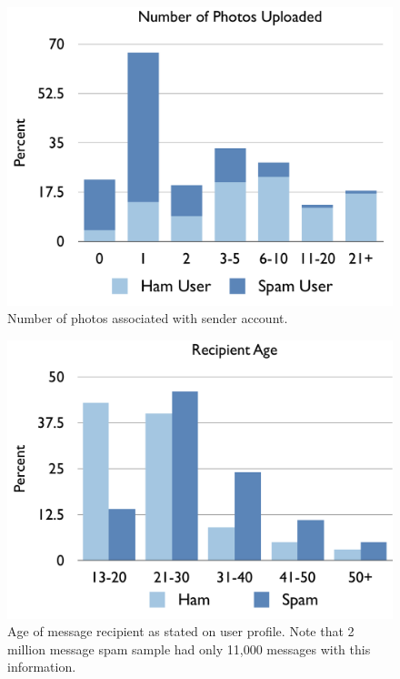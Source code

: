\documentclass[preprint]{acm_proc_article-sp}
\begin{document}
\begin{tabular}
{\begin{figure}[h]
    \centering
    \includegraphics[width=\linewidth]{figures/photos.pdf}
    \caption{Number of photos associated with sender account.}
    \label{fig:photos}
\end{figure}

\begin{figure}[h]
    \centering
    \includegraphics[width=\linewidth]{figures/recip-age.pdf}
    \caption{Age of message recipient as stated on user profile. Note that 2 million message spam sample 
        had only 11,000 messages with this information.}
    \label{fig:recipage}
\end{figure}

}
\end{tabular}
\end{document}
